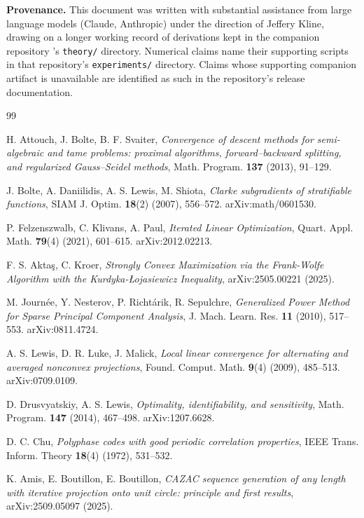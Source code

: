 \documentclass[11pt]{article}
\theoremstyle{plain}
\theoremstyle{definition}
\theoremstyle{remark}
\begin{document}
\textbf{Provenance.} This document was written with substantial assistance
from large language models (Claude, Anthropic) under the direction of
Jeffery Kline, drawing on a longer working record of derivations kept in
the companion repository \cite{CazacAlgorithmRepo}'s {\tt theory/}
directory. Numerical claims name their supporting scripts in that
repository's {\tt experiments/} directory. Claims whose supporting companion
artifact is unavailable are identified as such in the repository's release
documentation.

\begin{thebibliography}{99}

 H. Attouch, J. Bolte, B. F. Svaiter, \emph{Convergence of
descent methods for semi-algebraic and tame problems: proximal algorithms,
forward--backward splitting, and regularized Gauss--Seidel methods},
Math. Program. \textbf{137} (2013), 91--129.

 J. Bolte, A. Daniilidis, A. S. Lewis, M. Shiota,
\emph{Clarke subgradients of stratifiable functions}, SIAM J. Optim.
\textbf{18}(2) (2007), 556--572. arXiv:math/0601530.

 P. Felzenszwalb, C. Klivans, A. Paul, \emph{Iterated Linear
Optimization}, Quart. Appl. Math. \textbf{79}(4) (2021), 601--615.
arXiv:2012.02213.

 F. S. Akta\c{s}, C. Kroer, \emph{Strongly Convex Maximization
via the Frank-Wolfe Algorithm with the Kurdyka-{\L}ojasiewicz Inequality},
arXiv:2505.00221 (2025).

 M. Journ\'ee, Y. Nesterov, P. Richt\'arik, R. Sepulchre,
\emph{Generalized Power Method for Sparse Principal Component Analysis}, J. Mach. Learn. Res.
\textbf{11} (2010), 517--553. arXiv:0811.4724.

 A. S. Lewis, D. R. Luke, J. Malick, \emph{Local linear
convergence for alternating and averaged nonconvex projections}, Found.
Comput. Math. \textbf{9}(4) (2009), 485--513. arXiv:0709.0109.

 D. Drusvyatskiy, A. S. Lewis, \emph{Optimality,
identifiability, and sensitivity}, Math. Program. \textbf{147} (2014),
467--498. arXiv:1207.6628.

 D. C. Chu, \emph{Polyphase codes with good periodic
correlation properties}, IEEE Trans. Inform. Theory \textbf{18}(4) (1972),
531--532.

 K. Amis, E. Boutillon, E. Boutillon, \emph{CAZAC sequence
generation of any length with iterative projection onto unit circle:
principle and first results}, arXiv:2509.05097 (2025).


\end{thebibliography}
\end{document}

